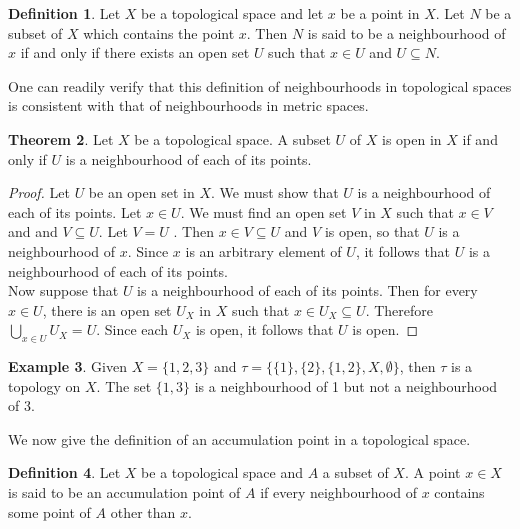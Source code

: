 \documentclass[11pt,a4paper]{article}
\theoremstyle{definition}
\newtheorem{thm}{Theorem}[subsection]
\newtheorem{defn}[thm]{Definition}
\newtheorem{exa}[thm]{Example}
\begin{document}
\begin{defn}
Let $X$ be a topological space and let $x$ be a point in $X$. Let $N$ be a subset of $X$ which contains the point $x$. Then $N$ is said to be a neighbourhood of $x$ if and only if there exists an open set $U$ such that $x\in U$ and $U\subseteq N$.
\end{defn}

One can readily verify that this definition of neighbourhoods in topological spaces is consistent with that of neighbourhoods in metric spaces.


\begin{thm}
Let $X$ be a topological space. A subset $U$ of $X$ is open in $X$ if and only if $U$ is a neighbourhood of each of its points.
\end{thm}

\begin{proof}
Let $U$ be an open set in $X$. We must show that $U$ is a neighbourhood of each of its points. Let $x\in U$. We must find an open set $V$ in $X$ such that $x\in V$ and and $V\subseteq U$. Let $V = U$ . Then $x\in V\subseteq U$ and $V$ is open, so that $U$ is a neighbourhood of $x$. Since $x$ is an arbitrary element of $U$, it follows that $U$ is a neighbourhood of each of its points.\\ 
Now suppose that $U$ is a neighbourhood of each of its points. Then for every $x\in U$, there is an open set $U_X$ in $X$ such that $x\in U_X\subseteq U$. Therefore $\bigcup_{x\in U}U_X=U$. Since each $U_X$ is open, it follows that $U$ is open.
\end{proof}




\begin{exa}
Given $X=\{1,2,3\}$ and $\tau=\{\{1\},\{2\},\{1,2\},X,\emptyset\}$, then $\tau$ is a topology on $X$. The set $\{1,3\}$ is a neighbourhood of 1 but not a neighbourhood of 3.
\end{exa}

We now give the definition of an accumulation point in a topological space.



\begin{defn}
Let $X$ be a topological space and $A$ a subset of $X$. A point $x\in X$ is said to be an accumulation point of $A$ if every neighbourhood of $x$ contains some point of $A$ other than $x$.
\end{defn}
\end{document}
